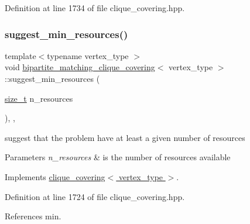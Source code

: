 Definition at line 1734 of file clique\+\_\+covering.\+hpp.

\mbox{\label{classbipartite__matching__clique__covering_a9404da13a622a47c62cecc9c4c9556d8}} 
\subsubsection{\texorpdfstring{suggest\+\_\+min\+\_\+resources()}{suggest\_min\_resources()}}
{\footnotesize\ttfamily template$<$typename vertex\+\_\+type $>$ \\
void \hyperlink{classbipartite__matching__clique__covering}{bipartite\+\_\+matching\+\_\+clique\+\_\+covering}$<$ vertex\+\_\+type $>$\+::suggest\+\_\+min\+\_\+resources (\begin{DoxyParamCaption}\item[{\hyperlink{tutorial__fpt__2017_2intro_2sixth_2test_8c_a7c94ea6f8948649f8d181ae55911eeaf}{size\+\_\+t}}]{n\+\_\+resources }\end{DoxyParamCaption})\hspace{0.3cm}{\ttfamily [inline]}, {\ttfamily [override]}, {\ttfamily [virtual]}}



suggest that the problem have at least a given number of resources 


\begin{DoxyParams}{Parameters}
{\em n\+\_\+resources} & is the number of resources available \\
\hline
\end{DoxyParams}


Implements \hyperlink{classclique__covering_aaf503ea280de45beb314149704414922}{clique\+\_\+covering$<$ vertex\+\_\+type $>$}.



Definition at line 1724 of file clique\+\_\+covering.\+hpp.



References min.

\mbox{\label{classbipartite__matching__clique__covering_a50c738b6d8386f57f09314859a9e417b}} 
